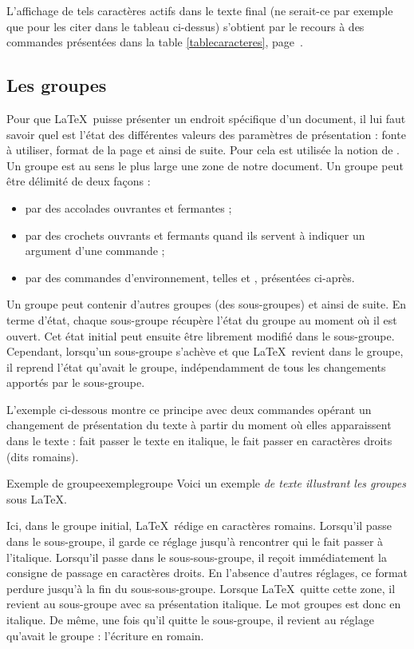 L'affichage de tels caractères actifs dans le texte final (ne serait-ce par exemple que pour les citer dans le tableau ci-dessus) s'obtient par le recours à des commandes présentées dans la table \ref{tablecaracteres}, page~\pageref{tablecaracteres}. \label{monexemple}


\subsection{Les groupes}

Pour que \LaTeX\ puisse présenter un endroit spécifique d'un document, il lui faut savoir quel est l'état des différentes valeurs des paramètres de présentation : fonte à utiliser, format de la page et ainsi de suite. Pour cela est utilisée la notion de . Un groupe est au sens le plus large une zone de notre document. Un groupe peut être délimité de deux façons : 
\begin{itemize}
\item par des accolades ouvrantes et fermantes ;
\item par des crochets ouvrants et fermants quand ils servent à indiquer un argument d'une commande ;
\item par des commandes d'environnement, telles  et , présentées ci-après.  
\end{itemize}

Un groupe peut contenir d'autres groupes (des sous-groupes) et ainsi de suite. En terme d'état, chaque sous-groupe récupère l'état du groupe au moment où il est ouvert. Cet état initial peut ensuite être librement modifié dans le sous-groupe. Cependant, lorsqu'un sous-groupe s'achève et que \LaTeX\ revient dans le groupe, il reprend l'état qu'avait le groupe, indépendamment de tous les changements apportés par le sous-groupe. 

L'exemple ci-dessous montre ce principe avec deux commandes opérant un changement de présentation du texte à partir du moment où elles apparaissent dans le texte :  fait passer le texte en italique,  le fait passer en caractères droits (dits romains).

\begin{codedouble}{Exemple de groupe}{exemplegroupe}
Voici un {exemple \itshape de {\upshape texte illustrant les} groupes} 
sous \LaTeX.
\end{codedouble}

Ici, dans le groupe initial, \LaTeX\ rédige en caractères romains. Lorsqu'il passe dans le sous-groupe, il garde ce réglage jusqu'à rencontrer  qui le fait passer à l'italique. Lorsqu'il passe dans le sous-sous-groupe, il reçoit immédiatement la consigne de passage en caractères droits. En l'absence d'autres réglages, ce format perdure jusqu'à la fin du sous-sous-groupe. Lorsque \LaTeX\ quitte cette zone, il revient au sous-groupe avec sa présentation italique. Le mot \og groupes \fg{} est donc en italique. De même, une fois qu'il quitte le sous-groupe, il revient au réglage qu'avait le groupe : l'écriture en romain.


